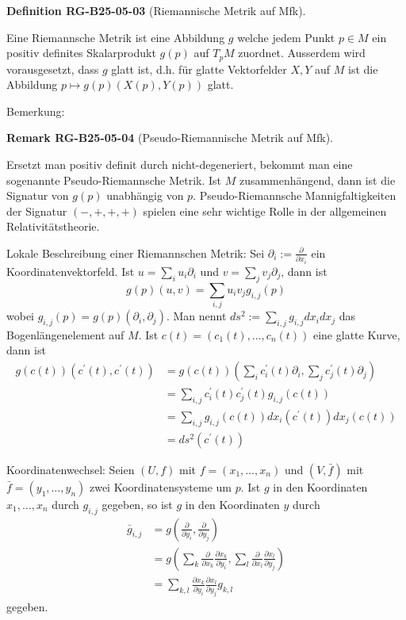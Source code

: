 \documentclass[10pt, letterpaper]{article}
\newcommand{\CustomHeading}[3]{%
  \par\medskip\noindent%
  \textbf{#1 #2} \textnormal{(#3)}.\enskip%
}
\newenvironment{DEF}[2]{\begin{unitbox}\CustomHeading{Definition}{#1}{#2}}{\end{unitbox}}
\newenvironment{REM}[2]{\begin{unitbox}\CustomHeading{Remark}{#1}{#2}}{\end{unitbox}}
\begin{document}
\begin{DEF}{RG-B25-05-03}{Riemannische Metrik auf Mfk}
Eine Riemannsche Metrik ist eine Abbildung $g$ welche jedem Punkt $p \in M$ ein positiv definites Skalarprodukt $g(p)$ auf $T_{p} M$ zuordnet. Ausserdem wird vorausgesetzt, dass $g$ glatt ist, d.h. für glatte Vektorfelder $X, Y$ auf $M$ ist die Abbildung $p \mapsto g(p)(X(p), Y(p))$ glatt.
\end{DEF}


Bemerkung: 

\begin{REM}{RG-B25-05-04}{Pseudo-Riemannische Metrik auf Mfk}
Ersetzt man positiv definit durch nicht-degeneriert, bekommt man eine sogenannte Pseudo-Riemannsche Metrik. Ist $M$ zusammenhängend, dann ist die Signatur von $g(p)$ unabhängig von $p$. Pseudo-Riemannsche Mannigfaltigkeiten der Signatur $(-,+,+,+)$ spielen eine sehr wichtige Rolle in der allgemeinen Relativitätstheorie.
\end{REM}


Lokale Beschreibung einer Riemannschen Metrik: Sei $\partial_{i}:=\frac{\partial}{\partial x_{i}}$ ein Koordinatenvektorfeld. Ist $u=\sum_{i} u_{i} \partial_{i}$ und $v=\sum_{j} v_{j} \partial_{j}$, dann ist
$$
g(p)(u, v)=\sum_{i, j} u_{i} v_{j} g_{i, j}(p)
$$
wobei $g_{i, j}(p)=g(p)\left(\partial_{i}, \partial_{j}\right)$. Man nennt $d s^{2}:=\sum_{i, j} g_{i, j} d x_{i} d x_{j}$ das Bogenlängenelement auf $M$. Ist $c(t)=\left(c_{1}(t), \ldots, c_{n}(t)\right)$ eine glatte Kurve, dann ist
$$
\begin{aligned}
g(c(t))\left(c^{\prime}(t), c^{\prime}(t)\right) & =g(c(t))\left(\sum_{i} c_{i}^{\prime}(t) \partial_{i}, \sum_{j} c_{j}^{\prime}(t) \partial_{j}\right) \\
& =\sum_{i, j} c_{i}^{\prime}(t) c_{j}^{\prime}(t) g_{i, j}(c(t)) \\
& =\sum_{i, j} g_{i, j}(c(t)) d x_{i}\left(c^{\prime}(t)\right) d x_{j}(c(t)) \\
& =d s^{2}\left(c^{\prime}(t)\right)
\end{aligned}
$$

Koordinatenwechsel: Seien $(U, f)$ mit $f=\left(x_{1}, \ldots, x_{n}\right)$ und $(V, \bar{f})$ mit $\bar{f}=\left(y_{1}, \ldots, y_{n}\right)$ zwei Koordinatensysteme um $p$. Ist $g$ in den Koordinaten $x_{1}, \ldots, x_{n}$ durch $g_{i, j}$ gegeben, so ist $g$ in den Koordinaten $y$ durch
$$
\begin{aligned}
\bar{g}_{i, j} & =g\left(\frac{\partial}{\partial y_{i}}, \frac{\partial}{\partial y_{j}}\right) \\
& =g\left(\sum_{k} \frac{\partial}{\partial x_{k}} \frac{\partial x_{k}}{\partial y_{i}}, \sum_{l} \frac{\partial}{\partial x_{l}} \frac{\partial x_{l}}{\partial y_{j}}\right) \\
& =\sum_{k, l} \frac{\partial x_{k}}{\partial y_{i}} \frac{\partial x_{l}}{\partial y_{j}} g_{k, l}
\end{aligned}
$$
gegeben.
\end{document}

